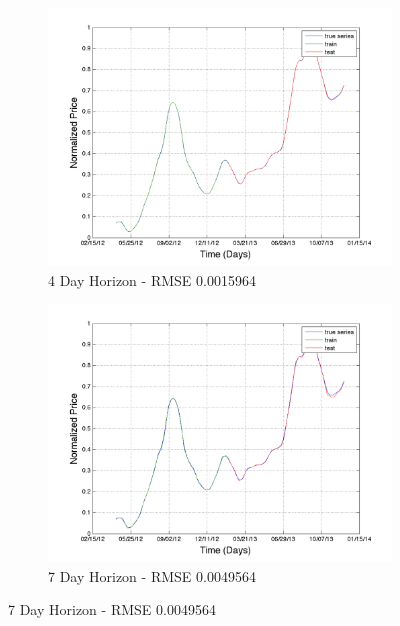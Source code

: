 \begin{figure}
        \centering
        \begin{subfigure}[b]{0.5\textwidth}
                \includegraphics[width=\textwidth]{img/model/milk/model1/pred_4}
                \caption{4 Day Horizon - RMSE 0.0015964}
                \label{fig:gull}
        \end{subfigure}%
        \begin{subfigure}[b]{0.5\textwidth}
                \includegraphics[width=\textwidth]{img/model/milk/model1/pred_7}
                \caption{7 Day Horizon - RMSE 0.0049564 }
                \label{fig:tiger}
        \end{subfigure}
       

\end{figure}
